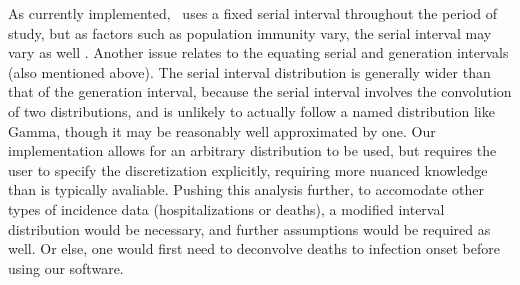 As currently implemented, \RtEstim\ uses a fixed serial interval throughout the
period of study, but as factors such as population immunity vary, the serial
interval may vary as well \citep{nash2023estimating}.  
Another issue relates to the equating serial and generation intervals (also
mentioned above). The serial interval distribution is generally
wider than that of the generation interval, because the serial interval
involves the convolution of two distributions, and is unlikely to actually
follow a named distribution like Gamma, though it may be reasonably well
approximated by one. Our implementation allows for an arbitrary distribution to
be used, but requires the user to specify the discretization explicitly,
requiring more nuanced knowledge than is typically avaliable.
Pushing this analysis further, to accomodate other types of incidence data
(hospitalizations or deaths), a modified interval distribution would be
necessary, and further assumptions would be required as well. Or else, one would
first need to deconvolve deaths to infection onset before using our software.




